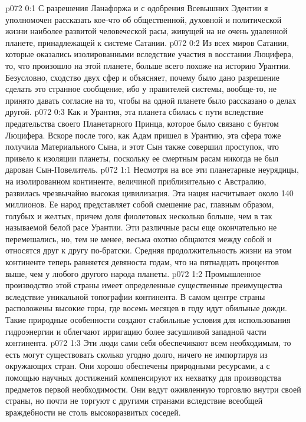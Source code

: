 \vs p072 0:1 С разрешения Ланафоржа и с одобрения Всевышних Эдентии я уполномочен рассказать кое\hyp{}что об общественной, духовной и политической жизни наиболее развитой человеческой расы, живущей на не очень удаленной планете, принадлежащей к системе Сатании.
\vs p072 0:2 Из всех миров Сатании, которые оказались изолированными вследствие участия в восстании Люцифера, то, что произошло на этой планете, больше всего похоже на историю Урантии. Безусловно, сходство двух сфер и объясняет, почему было дано разрешение сделать это странное сообщение, ибо у правителей системы, вообще\hyp{}то, не принято давать согласие на то, чтобы на одной планете было рассказано о делах другой.
\vs p072 0:3 Как и Урантия, эта планета сбилась с пути вследствие предательства своего Планетарного Принца, которое было связано с бунтом Люцифера. Вскоре после того, как Адам пришел в Урантию, эта сфера тоже получила Материального Сына, и этот Сын также совершил проступок, что привело к изоляции планеты, поскольку ее смертным расам никогда не был дарован Сын\hyp{}Повелитель.
\vs p072 1:1 Несмотря на все эти планетарные неурядицы, на изолированном континенте, величиной приблизительно с Австралию, развилась чрезвычайно высокая цивилизация. Эта нация насчитывает около 140 миллионов. Ее народ представляет собой смешение рас, главным образом, голубых и желтых, причем доля фиолетовых несколько больше, чем в так называемой белой расе Урантии. Эти различные расы еще окончательно не перемешались, но, тем не менее, весьма охотно общаются между собой и относятся друг к другу по\hyp{}братски. Средняя продолжительность жизни на этом континенте теперь равняется девяноста годам, что на пятнадцать процентов выше, чем у любого другого народа планеты.
\vs p072 1:2 Промышленное производство этой страны имеет определенные существенные преимущества вследствие уникальной топографии континента. В самом центре страны расположены высокие горы, где восемь месяцев в году идут обильные дожди. Такие природные особенности создают стабильные условия для использования гидроэнергии и облегчают ирригацию более засушливой западной части континента.
\vs p072 1:3 Эти люди сами себя обеспечивают всем необходимым, то есть могут существовать сколько угодно долго, ничего не импортируя из окружающих стран. Они хорошо обеспечены природными ресурсами, а с помощью научных достижений компенсируют их нехватку для производства предметов первой необходимости. Они ведут оживленную торговлю внутри своей страны, но почти не торгуют с другими странами вследствие всеобщей враждебности не столь высокоразвитых соседей.
